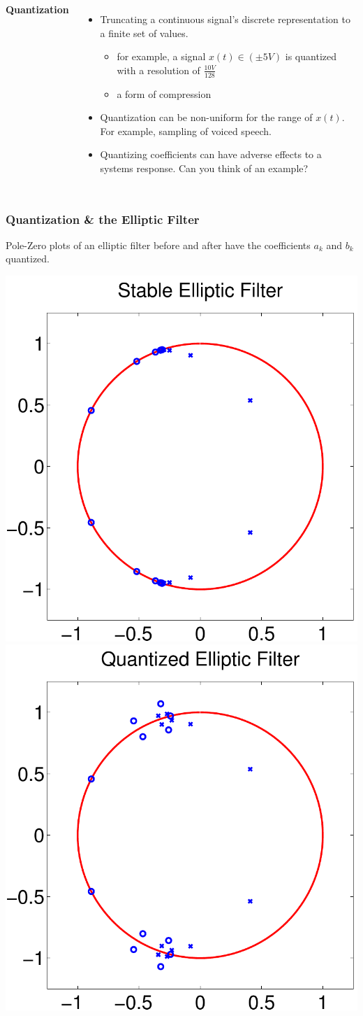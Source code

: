 \documentclass[mathserif,9pt,handout]{beamer}
\begin{document}
\begin{frame}
\begin{columns}
    {\color{blue!50!black}\bf Quantization}
    \begin{itemize}
      \item Truncating a continuous signal's discrete representation to a finite set of values. 
        \begin{itemize}
          \item for example, a signal $x(t) \in (\pm 5V)$ is quantized with a resolution of $\frac{10V}{128}$
          \item a form of compression
        \end{itemize} 
      \item Quantization can be  non-uniform for the range of $x(t)$. For example, sampling of voiced speech. 
      \item Quantizing coefficients can have adverse effects to a systems response. Can you think of an example?
    \end{itemize}
  \end{columns}
\end{frame}

\begin{frame}\frametitle{Quantization \& the Elliptic Filter}\small
  \begin{center}
    Pole-Zero plots of an elliptic filter before and after have the coefficients $a_k$ and 
    $b_k$ quantized. \\
    \vspace{1em}
    
    \includegraphics[width=.45\textwidth]{ellip_pz_stable.pdf} \hspace{1em}
    \includegraphics[width=.45\textwidth]{ellip_pz_unstable.pdf}
  \end{center}
\end{frame}
\end{document}
